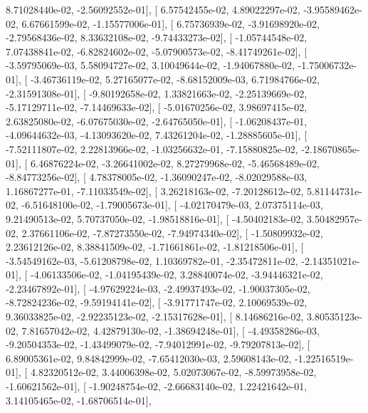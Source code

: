 \documentclass{article}
\begin{document}
          8.71028440e-02,  -2.56092552e-01],
       [  6.57542455e-02,   4.89022297e-02,  -3.95589462e-02,
          6.67661599e-02,  -1.15577006e-01],
       [  6.75736939e-02,  -3.91698920e-02,  -2.79568436e-02,
          8.33632108e-02,  -9.74433273e-02],
       [ -1.05744548e-02,   7.07438841e-02,  -6.82824602e-02,
         -5.07900573e-02,  -8.41749261e-02],
       [ -3.59795069e-03,   5.58094727e-02,   3.10049644e-02,
         -1.94067880e-02,  -1.75006732e-01],
       [ -3.46736119e-02,   5.27165077e-02,  -8.68152009e-03,
          6.71984766e-02,  -2.31591308e-01],
       [ -9.80192658e-02,   1.33821663e-02,  -2.25139669e-02,
         -5.17129711e-02,  -7.14469633e-02],
       [ -5.01670256e-02,   3.98697415e-02,   2.63825080e-02,
         -6.07675030e-02,  -2.64765050e-01],
       [ -1.06208437e-01,  -4.09644632e-03,  -4.13093620e-02,
          7.43261204e-02,  -1.28885605e-01],
       [ -7.52111807e-02,   2.22813966e-02,  -1.03256632e-01,
         -7.15880825e-02,  -2.18670865e-01],
       [  6.46876224e-02,  -3.26641002e-02,   8.27279968e-02,
         -5.46568489e-02,  -8.84773256e-02],
       [  4.78378005e-02,  -1.36090247e-02,  -8.02029588e-03,
          1.16867277e-01,  -7.11033549e-02],
       [  3.26218163e-02,  -7.20128612e-02,   5.81144731e-02,
         -6.51648100e-02,  -1.79005673e-01],
       [ -4.02170479e-03,   2.07375114e-03,   9.21490513e-02,
          5.70737050e-02,  -1.98518816e-01],
       [ -4.50402183e-02,   3.50482957e-02,   2.37661106e-02,
         -7.87273550e-02,  -7.94974340e-02],
       [ -1.50809932e-02,   2.23612126e-02,   8.38841509e-02,
         -1.71661861e-02,  -1.81218506e-01],
       [ -3.54549162e-03,  -5.61208798e-02,   1.10369782e-01,
         -2.35472811e-02,  -2.14351021e-01],
       [ -4.06133506e-02,  -1.04195439e-02,   3.28840074e-02,
         -3.94446321e-02,  -2.23467892e-01],
       [ -4.97629224e-03,  -2.49937493e-02,  -1.90037305e-02,
         -8.72824236e-02,  -9.59194141e-02],
       [ -3.91771747e-02,   2.10069539e-02,   9.36033825e-02,
         -2.92235123e-02,  -2.15317628e-01],
       [  8.14686216e-02,   3.80535123e-02,   7.81657042e-02,
          4.42879130e-02,  -1.38694248e-01],
       [ -4.49358286e-03,  -9.20504353e-02,  -1.43499079e-02,
         -7.94012991e-02,  -9.79207813e-02],
       [  6.89005361e-02,   9.84842999e-02,  -7.65412030e-03,
          2.59608143e-02,  -1.22516519e-01],
       [  4.82320512e-02,   3.44006398e-02,   5.02073067e-02,
         -8.59973958e-02,  -1.60621562e-01],
       [ -1.90248754e-02,  -2.66683140e-02,   1.22421642e-01,
          3.14105465e-02,  -1.68706514e-01],
\end{document}
